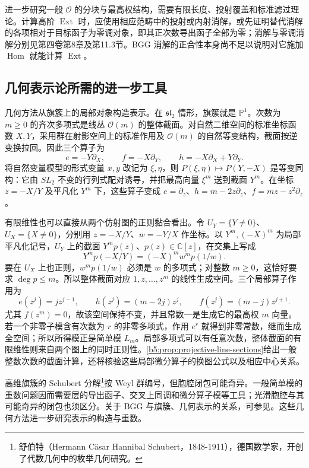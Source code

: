 \ProseParagraphBreak
进一步研究一般 \(\mathcal O\) 的分块与最高权结构，需要有限长度、投射覆盖和标准滤过理论。计算高阶 \(\operatorname{Ext}\) 时，应使用相应范畴中的投射或内射消解，或先证明替代消解的各项相对于目标函子为零调对象，即其正次数导出函子全部为零；消解与零调消解分别见第四卷第8章及第11.3节。BGG 消解的正合性本身尚不足以说明对它施加 \(\operatorname{Hom}\) 就能计算 \(\operatorname{Ext}\)。

\subsection{几何表示论所需的进一步工具}
\label{b5:subsec:2004:03}

几何方法从旗簇上的局部对象构造表示。在 \(\mathfrak{sl}_2\) 情形，旗簇就是 \(\mathbb P^1\)。次数为 \(m\ge0\) 的齐次多项式是线丛 \(\mathcal O(m)\) 的整体截面。对自然二维空间的标准坐标函数 \(X,Y\)，采用群在射影空间上的标准作用及 \(\mathcal O(m)\) 的自然等变结构，截面按逆变换拉回。因此三个算子为
\[
	e=-Y\partial_X,\qquad f=-X\partial_Y,\qquad h=-X\partial_X+Y\partial_Y.
\]
将自然变量模型的形式变量 \(x,y\) 改记为 \(\xi,\eta\)，则 \(P(\xi,\eta)\mapsto P(Y,-X)\) 是等变同构：它由 \(SL_2\) 不变的行列式配对诱导，并把最高向量 \(\xi^m\) 送到截面 \(Y^m\)。在坐标 \(z=-X/Y\) 及平凡化 \(Y^m\) 下，这些算子变成 \(e=\partial_z\)、\(h=m-2z\partial_z\)、\(f=mz-z^2\partial_z\)。

\ProseParagraphBreak

有限维性也可以直接从两个仿射图的正则黏合看出。令 \(U_Y=\{Y\ne0\}\)、\(U_X=\{X\ne0\}\)，分别用 \(z=-X/Y\)、\(w=-Y/X\) 作坐标。以 \(Y^m,(-X)^m\) 为局部平凡化记号，\(U_Y\) 上的截面 \(Y^m p(z)\)、\(p(z)\in\mathbb C[z]\)，在交集上写成
\[
	Y^m p(-X/Y)=(-X)^m w^m p(1/w).
\]
要在 \(U_X\) 上也正则，\(w^m p(1/w)\) 必须是 \(w\) 的多项式；对整数 \(m\ge0\)，这恰好要求 \(\deg p\le m\)。所以整体截面对应 \(1,z,\ldots,z^m\) 的线性生成空间。三个局部算子作用为
\[
	e(z^j)=jz^{j-1},\qquad h(z^j)=(m-2j)z^j,\qquad f(z^j)=(m-j)z^{j+1}.
\]
尤其 \(f(z^m)=0\)，故该空间保持不变，并且常数一是生成它的最高权 \(m\) 向量。若一个非零子模含有次数为 \(r\) 的非零多项式，作用 \(e^r\) 就得到非零常数，继而生成全空间；所以所得模正是简单模 \(L_m\)。局部多项式可以有任意次数，整体截面的有限维性则来自两个图上的同时正则性。\cref{b5:prop:projective-line-sections}给出一般整数次数的截面计算，还将核验这些局部微分算子的换图公式以及相应中心关系。

\ProseParagraphBreak
高维旗簇的 Schubert 分解\footnote{舒伯特（Hermann Cäsar Hannibal Schubert，1848-1911），德国数学家，开创了代数几何中的枚举几何研究。}按 Weyl 群编号，但胞腔闭包可能奇异。一般简单模的重数问题因而需要层的导出函子、交叉上同调和微分算子模等工具；光滑胞腔与其可能奇异的闭包也须区分。关于 BGG 与旗簇、几何表示的关系，可参见\cite[Section 8.4 and Further reading, Geometric representation theory]{Kirillov2008LieGroups}。这些几何方法进一步研究表示的构造与重数。
